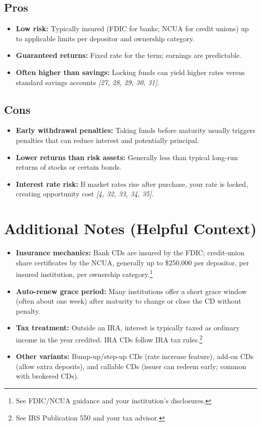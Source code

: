 \documentclass[11pt]{article}
\begin{document}
\subsection*{Pros}
\begin{itemize}
  \item \textbf{Low risk:} Typically insured (FDIC for banks; NCUA for credit unions) up to applicable limits per depositor and ownership category.
  \item \textbf{Guaranteed returns:} Fixed rate for the term; earnings are predictable.
  \item \textbf{Often higher than savings:} Locking funds can yield higher rates versus standard savings accounts \textit{[27, 28, 29, 30, 31]}.
\end{itemize}

\subsection*{Cons}
\begin{itemize}
  \item \textbf{Early withdrawal penalties:} Taking funds before maturity usually triggers penalties that can reduce interest and potentially principal.
  \item \textbf{Lower returns than risk assets:} Generally less than typical long-run returns of stocks or certain bonds.
  \item \textbf{Interest rate risk:} If market rates rise after purchase, your rate is locked, creating opportunity cost \textit{[4, 32, 33, 34, 35]}.
\end{itemize}

\section*{Additional Notes (Helpful Context)}
\begin{itemize}
  \item \textbf{Insurance mechanics:} Bank CDs are insured by the FDIC; credit-union share certificates by the NCUA, generally up to \$250{,}000 per depositor, per insured institution, per ownership category.\footnote{See FDIC/NCUA guidance and your institution's disclosures.}
  \item \textbf{Auto-renew grace period:} Many institutions offer a short grace window (often about one week) after maturity to change or close the CD without penalty.
  \item \textbf{Tax treatment:} Outside an IRA, interest is typically taxed as ordinary income in the year credited. IRA CDs follow IRA tax rules.\footnote{See IRS Publication 550 and your tax advisor.}
  \item \textbf{Other variants:} Bump-up/step-up CDs (rate increase feature), add-on CDs (allow extra deposits), and callable CDs (issuer can redeem early; common with brokered CDs).
\end{itemize}
\end{document}
